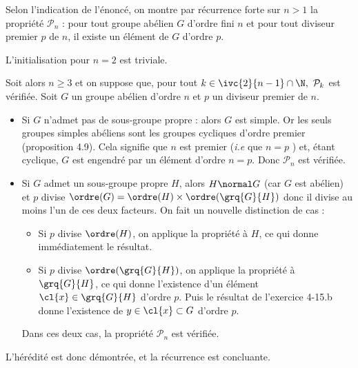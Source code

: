 
Selon l'indication de l'énoncé, on montre par récurrence forte sur $n>1$ la propriété $\mathcal{P}_n$ : pour tout groupe abélien $G$ d'ordre fini $n$ et pour tout diviseur 
premier $p$ de $n$, il existe un élément de $G$ d'ordre $p$.

L'initialisation pour $n = 2$ est triviale.

Soit alors $n\geq 3$ et on suppose que, pour tout $k\in \ivc{2}{n-1}\cap \N,~ \mathcal{P}_k$ est vérifiée. Soit $G$ un groupe abélien d'ordre $n$ et $p$ un diviseur premier 
de $n$.
\begin{itemize}
  \item Si $G$ n'admet pas de sous-groupe propre : alors $G$ est simple. Or les seuls groupes simples abéliens sont les groupes cycliques d'ordre premier (proposition 4.9).
   Cela signifie que $n$ est premier (\emph{i.e} que $n=p$ ) et, étant cyclique, $G$ est engendré par un élément d'ordre $n=p$. Donc $\mathcal{P}_n$ est vérifiée.
  \item Si $G$ admet un sous-groupe propre $H$, alors $H \normal G$ (car $G$ est abélien) et $p$ divise $\ordre(G) = \ordre(H)\times \ordre(\grq{G}{H})$ donc il divise au moins l'un de ces deux facteurs. On fait un nouvelle distinction de cas :
  \begin{itemize}
    \item Si $p$ divise $\ordre(H)$, on applique la propriété à $H$, ce qui donne immédiatement le résultat. 
    \item Si $p$ divise $\ordre(\grq{G}{H})$, on applique la propriété à $\grq{G}{H}$, ce qui donne l'existence d'un élément $\cl{x} \in \grq{G}{H}$ d'ordre $p$. Puis le résultat de l'exercice 4-15.b 
    donne l'existence de $y\in \cl{x}\subset G$ d'ordre $p$. 
  \end{itemize} 
  Dans ces deux cas, la propriété $\mathcal{P}_n$ est vérifiée.
\end{itemize}
L'hérédité est donc démontrée, et la récurrence est concluante.
